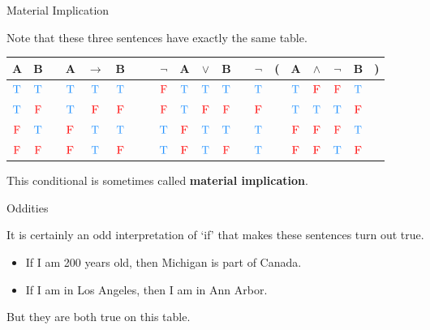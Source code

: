 \documentclass[
  ignorenonframetext,
]{beamer}
\providecommand{\tightlist}{%
  \setlength{\itemsep}{0pt}\setlength{\parskip}{0pt}}
\renewcommand{\,}{\text{, }}
\def\True{\textcolor{dodgerblue}{\text{T}}}
\def\False{\textcolor{red}{\text{F}}}
\begin{document}
\begin{frame}{Material Implication}
\protect\hypertarget{material-implication}{}

Note that these three sentences have exactly the same table.

\begin{center}
\bigskip
\begin{tabular}{@{ }c@{ }@{ }c | c@{ }@{ }c@{ }@{ }c@{ }@{ }c@{ }@{ }c | c@{ }@{ }c@{ }@{ }c@{ }@{ }c@{ }@{ }c@{ }@{ }c | c@{ }@{}c@{}@{ }c@{ }@{ }c@{ }@{ }c@{ }@{ }c@{ }@{}c@{ }}
A & B &  & A & $\rightarrow$ & B &  &  & $\neg$ & A & $\vee$ & B &  & $\neg$ & ( & A & $\wedge$ & $\neg$ & B & )\\
\hline 
$\True$ & $\True$ &  & $\True$ & \textcolor{red}{$\True$} & $\True$ &  &  & $\False$ & $\True$ & \textcolor{red}{$\True$} & $\True$ &  & \textcolor{red}{$\True$} &  & $\True$ & $\False$ & $\False$ & $\True$ & \\
$\True$ & $\False$ &  & $\True$ & \textcolor{red}{$\False$} & $\False$ &  &  & $\False$ & $\True$ & \textcolor{red}{$\False$} & $\False$ &  & \textcolor{red}{$\False$} &  & $\True$ & $\True$ & $\True$ & $\False$ & \\
$\False$ & $\True$ &  & $\False$ & \textcolor{red}{$\True$} & $\True$ &  &  & $\True$ & $\False$ & \textcolor{red}{$\True$} & $\True$ &  & \textcolor{red}{$\True$} &  & $\False$ & $\False$ & $\False$ & $\True$ & \\
$\False$ & $\False$ &  & $\False$ & \textcolor{red}{$\True$} & $\False$ &  &  & $\True$ & $\False$ & \textcolor{red}{$\True$} & $\False$ &  & \textcolor{red}{$\True$} &  & $\False$ & $\False$ & $\True$ & $\False$ & \\
\end{tabular}
\bigskip
\end{center}

This conditional is sometimes called \textbf{material implication}.

\end{frame}

\begin{frame}{Oddities}
\protect\hypertarget{oddities}{}

It is certainly an odd interpretation of `if' that makes these sentences
turn out true.

\begin{itemize}
\tightlist
\item
  If I am 200 years old, then Michigan is part of Canada.
\item
  If I am in Los Angeles, then I am in Ann Arbor.
\end{itemize}

But they are both true on this table.

\end{frame}
\end{document}
